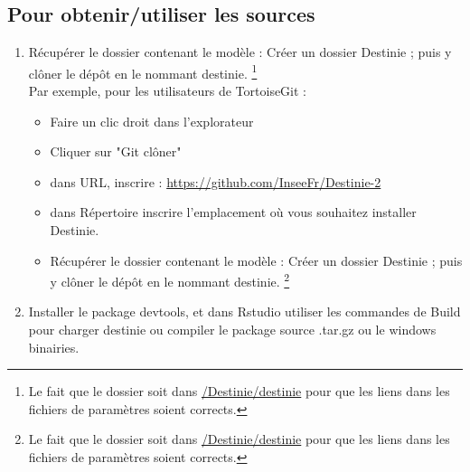 \subsection{Pour obtenir/utiliser les sources}

\begin{enumerate}
\item Récupérer le dossier contenant le modèle : 
Créer un dossier Destinie ; puis y clôner le dépôt en le nommant destinie. \footnote{Le fait que le dossier soit dans \url{/Destinie/destinie} pour que les liens dans les fichiers de paramètres soient corrects.} \\
Par exemple, pour les utilisateurs de TortoiseGit :
\begin{itemize}
\item Faire un clic droit dans l'explorateur
\item Cliquer sur "Git clôner"
\item  dans URL, inscrire : \url{https://github.com/InseeFr/Destinie-2}
\item dans Répertoire inscrire l'emplacement où vous souhaitez installer Destinie. \item Récupérer le dossier contenant le modèle : 
Créer un dossier Destinie ; puis y clôner le dépôt en le nommant destinie. \footnote{Le fait que le dossier soit dans \url{/Destinie/destinie} pour que les liens dans les fichiers de paramètres soient corrects.} \\
\end{itemize}
% 
  \item  Installer le package devtools, et dans Rstudio utiliser les commandes de Build pour charger destinie ou compiler le package source .tar.gz ou le windows binairies. 
\end{enumerate}



